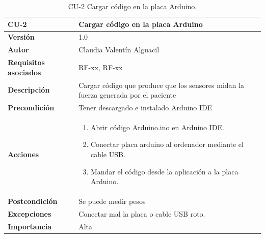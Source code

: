 \begin{table}[p]
	\centering
	\begin{tabularx}{\linewidth}{ p{} p{} }
		\toprule
		\textbf{CU-2}    & \textbf{Cargar código en la placa Arduino }\\
		\toprule
		\textbf{Versión}              & 1.0    \\
		\textbf{Autor}                & Claudia Valentín Alguacil \\
		\textbf{Requisitos asociados} & RF-xx, RF-xx \\
		\textbf{Descripción}          & Cargar código que produce que los sensores midan la fuerza generada por el paciente  \\
		\textbf{Precondición}         & Tener descargado e instalado Arduino IDE \\
		\textbf{Acciones}             &
		\begin{enumerate}
			\def\labelenumi{\arabic{enumi}.}
			\tightlist
			\item Abrir código Arduino.ino en Arduino IDE.
			\item Conectar placa arduino al ordenador mediante el cable USB.
                \item Mandar el código desde la aplicación a la placa Arduino.
		\end{enumerate}\\
		\textbf{Postcondición}        &  Se puede medir pesos\\
		\textbf{Excepciones}          & Conectar mal la placa o cable USB roto. \\
		\textbf{Importancia}          & Alta \\
		\bottomrule
	\end{tabularx}
	\caption{CU-2 Cargar código en la placa Arduino.}
\end{table}

